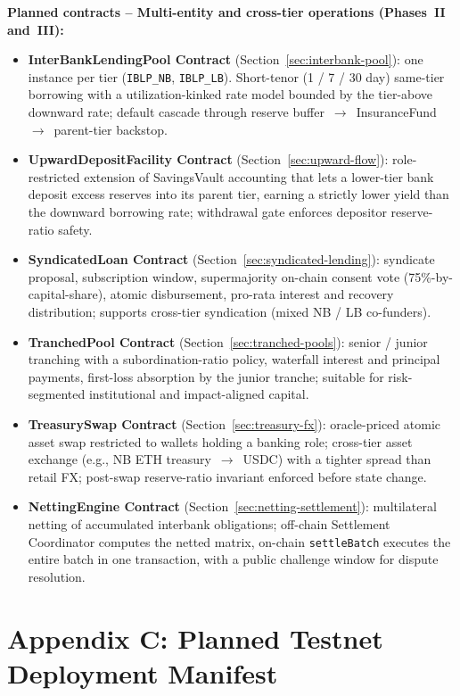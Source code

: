 \documentclass[12pt,a4paper]{report}
\begin{document}
\textbf{Planned contracts -- Multi-entity and cross-tier operations (Phases~II and~III):}
\begin{itemize}[noitemsep]
\item \textbf{InterBankLendingPool Contract} (Section~\ref{sec:interbank-pool}): one instance per tier (\texttt{IBLP\_NB}, \texttt{IBLP\_LB}). Short-tenor (1 / 7 / 30 day) same-tier borrowing with a utilization-kinked rate model bounded by the tier-above downward rate; default cascade through reserve buffer~$\to$~InsuranceFund~$\to$~parent-tier backstop.
\item \textbf{UpwardDepositFacility Contract} (Section~\ref{sec:upward-flow}): role-restricted extension of SavingsVault accounting that lets a lower-tier bank deposit excess reserves into its parent tier, earning a strictly lower yield than the downward borrowing rate; withdrawal gate enforces depositor reserve-ratio safety.
\item \textbf{SyndicatedLoan Contract} (Section~\ref{sec:syndicated-lending}): syndicate proposal, subscription window, supermajority on-chain consent vote (75\%-by-capital-share), atomic disbursement, pro-rata interest and recovery distribution; supports cross-tier syndication (mixed NB / LB co-funders).
\item \textbf{TranchedPool Contract} (Section~\ref{sec:tranched-pools}): senior / junior tranching with a subordination-ratio policy, waterfall interest and principal payments, first-loss absorption by the junior tranche; suitable for risk-segmented institutional and impact-aligned capital.
\item \textbf{TreasurySwap Contract} (Section~\ref{sec:treasury-fx}): oracle-priced atomic asset swap restricted to wallets holding a banking role; cross-tier asset exchange (e.g., NB ETH treasury~$\to$~USDC) with a tighter spread than retail FX; post-swap reserve-ratio invariant enforced before state change.
\item \textbf{NettingEngine Contract} (Section~\ref{sec:netting-settlement}): multilateral netting of accumulated interbank obligations; off-chain Settlement Coordinator computes the netted matrix, on-chain \texttt{settleBatch} executes the entire batch in one transaction, with a public challenge window for dispute resolution.
\end{itemize}


\chapter*{Appendix C: Planned Testnet Deployment Manifest}
{}
\end{document}
